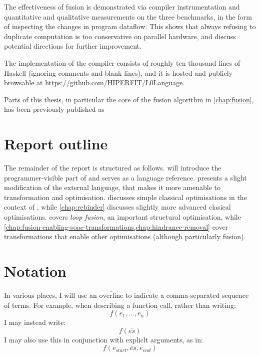 The effectiveness of fusion is demonstrated via compiler
instrumentation and quantitative and qualitative measurements on the
three benchmarks, in the form of inspecting the changes in program
dataflow.  This shows that always refusing to duplicate computation is
too conservative on parallel hardware, and discuss potential
directions for further improvement.

The implementation of the \LO{} compiler consists of roughly ten
thousand lines of Haskell (ignoring comments and blank lines), and it
is hosted and publicly browsable at
\url{https://github.com/HIPERFIT/L0Language}.

Parts of this thesis, in particular the core of the fusion algorithm
in \cref{chap:fusion}, has been previously published as

\begin{quote}
\end{quote}

\section{Report outline}

The remainder of the report is structured as follows.
 will introduce the
programmer-visible part of \LO{} and serves as a language reference.
 presents a slight modification of the external
language, that makes it more amenable to transformation and
optimisation.   discusses simple
classical optimisations in the context of \LO{}, while
\cref{chap:rebinder} discusses slightly more advanced clasical
optimisations.   covers \textit{loop fusion}, an
important structural optimisation, while
\cref{chap:fusion-enabling-soac-transformations,chap:hindrance-removal}
cover transformations that enable other optimisations (although
particularly fusion).

\section{Notation}

In various places, I will use an \(\overline{\text{overline}}\) to
indicate a comma-separated sequence of terms.  For example, when
describing a function call, rather than writing:
\[
f(e_{1},\ldots,e_{n})
\]
I may instead write:
\[
f(\overline{es})
\]
I may also use this in conjunction with expliclt arguments, as in:
\[
f(e_{start},\overline{es},e_{end})
\]

